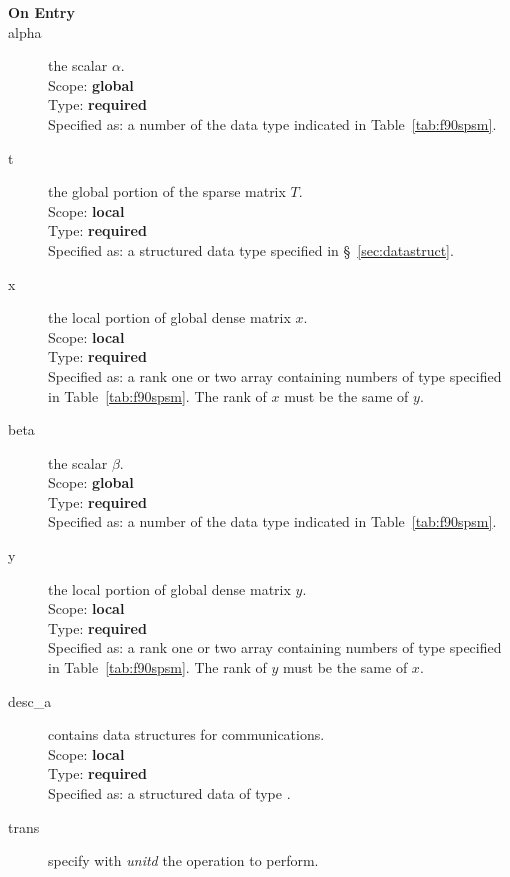 \begin{description}
\item[\bf On Entry]
\item[alpha] the scalar $\alpha$.\\
Scope: {\bf global} \\
Type: {\bf required}\\
Specified as: a number of the data type indicated in
Table~\ref{tab:f90spsm}.
\item[t] the global portion of the sparse matrix
$T$.  \\ 
Scope: {\bf local} \\
Type: {\bf required}\\
Specified as: a structured data type specified in
\S~\ref{sec:datastruct}.
\item[x] the local portion of global dense matrix
$x$. %
\\
Scope: {\bf local} \\
Type: {\bf required} \\
Specified as:  a rank one or two array 
containing numbers of type specified in
Table~\ref{tab:f90spsm}.  The rank of $x$ must be the same of $y$. 
\item[beta] the scalar $\beta$.\\
Scope: {\bf global} \\
Type: {\bf required} \\
Specified as: a number of the data type indicated in Table~\ref{tab:f90spsm}.
\item[y] the local portion of global dense matrix
$y$. %
\\
Scope: {\bf local} \\
Type: {\bf required} \\
Specified as:  a rank one or two array 
containing numbers of type specified in
Table~\ref{tab:f90spsm}. The rank of $y$ must be the same of $x$. 
\item[desc\_a] contains data structures for communications.\\
Scope: {\bf local} \\
Type: {\bf required}\\
Specified as: a structured data of type \descdata.
\item[trans] specify with {\em unitd} the operation to perform.

\end{description}
